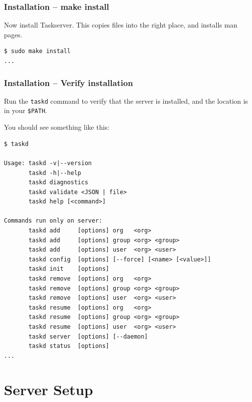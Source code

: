 \documentclass[t,handout]{beamer}
\begin{document}
\begin{frame}[fragile]\frametitle{Installation -- make install}
    \vfill
    Now install Taskserver.  This copies files into the right place, and installs man pages.

    \begin{lstlisting}
$ sudo make install
...\end{lstlisting}
\end{frame}

\begin{frame}[fragile]\frametitle{Installation -- Verify installation}
    Run the \verb+taskd+ command to verify that the server is installed, and the location is in your \verb+$PATH+.

    You should see something like this:

    \begin{lstlisting}
$ taskd

Usage: taskd -v|--version
       taskd -h|--help
       taskd diagnostics
       taskd validate <JSON | file>
       taskd help [<command>]

Commands run only on server:
       taskd add     [options] org   <org>
       taskd add     [options] group <org> <group>
       taskd add     [options] user  <org> <user>
       taskd config  [options] [--force] [<name> [<value>]]
       taskd init    [options]
       taskd remove  [options] org   <org>
       taskd remove  [options] group <org> <group>
       taskd remove  [options] user  <org> <user>
       taskd resume  [options] org   <org>
       taskd resume  [options] group <org> <group>
       taskd resume  [options] user  <org> <user>
       taskd server  [options] [--daemon]
       taskd status  [options]
...\end{lstlisting}
\end{frame}

\section{Server Setup}
\end{document}
